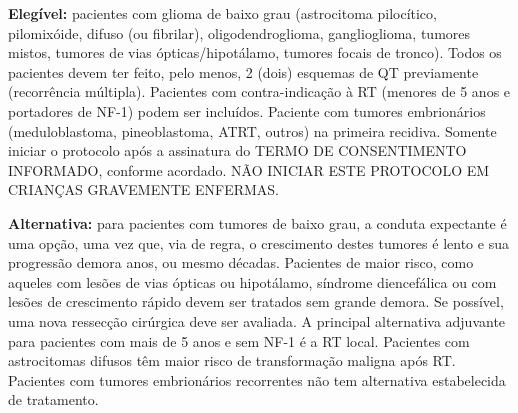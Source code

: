 \documentclass[11pt,a4paper,oldfontcommands]{memoir}
\begin{document}
\textbf{Elegível:} pacientes com glioma de baixo grau (astrocitoma pilocítico, pilomixóide, difuso (ou fibrilar), oligodendroglioma, ganglioglioma, tumores mistos, tumores de vias ópticas/hipotálamo, tumores focais de tronco). Todos os pacientes devem ter feito, pelo menos, 2 (dois) esquemas de QT previamente (recorrência múltipla). Pacientes com contra-indicação à RT (menores de 5 anos e portadores de NF-1) podem ser incluídos. Paciente com tumores embrionários (meduloblastoma, pineoblastoma, ATRT, outros) na primeira recidiva. Somente iniciar o protocolo após a assinatura do TERMO DE CONSENTIMENTO INFORMADO, conforme acordado. NÃO INICIAR ESTE PROTOCOLO EM CRIANÇAS GRAVEMENTE ENFERMAS.

\textbf{Alternativa:} para pacientes com tumores de baixo grau, a conduta expectante é uma opção, uma vez que, via de regra, o crescimento destes tumores é lento e sua progressão demora anos, ou mesmo décadas. Pacientes de maior risco, como aqueles com lesões de vias ópticas ou hipotálamo, síndrome diencefálica ou com lesões de crescimento rápido devem ser tratados sem grande demora. Se possível, uma nova ressecção cirúrgica deve ser avaliada. A principal alternativa adjuvante para pacientes com mais de 5 anos e sem NF-1 é a RT local. Pacientes com astrocitomas difusos têm maior risco de transformação maligna após RT. Pacientes com tumores embrionários recorrentes não tem alternativa estabelecida de tratamento.

\hfill \\

\hfill  {}\\
\end{document}

